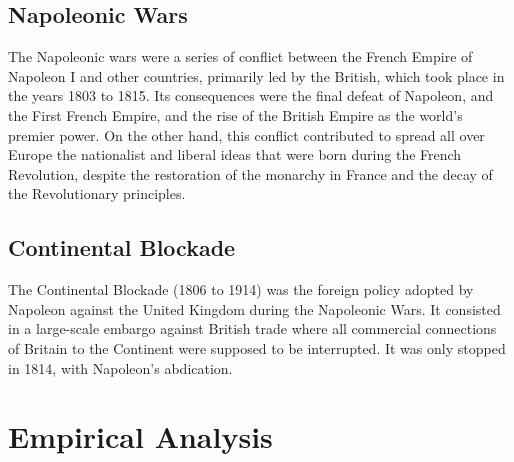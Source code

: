 \documentclass[12pt,a4paper,notitlepage,english]{article}
\begin{document}
\subsection{Napoleonic Wars}
The Napoleonic wars were a series of conflict between the French Empire of Napoleon I and  other countries, primarily led by the British, which took place in the years 1803 to 1815. Its consequences were the final defeat of Napoleon, and the First French Empire, and the rise of the British Empire as the world's premier power. On the other hand, this conflict contributed to spread all over Europe the nationalist and liberal ideas that were born during the French Revolution, despite the restoration of the monarchy in France and the decay of the Revolutionary principles. 

\subsection{Continental Blockade}
The Continental Blockade (1806 to 1914) was the foreign policy adopted by Napoleon against the United Kingdom during the Napoleonic Wars. It consisted in a large-scale embargo against British trade where all commercial connections of Britain to the Continent were supposed to be interrupted. It was only stopped in 1814, with Napoleon's abdication. 

\section{Empirical Analysis}
\end{document}
